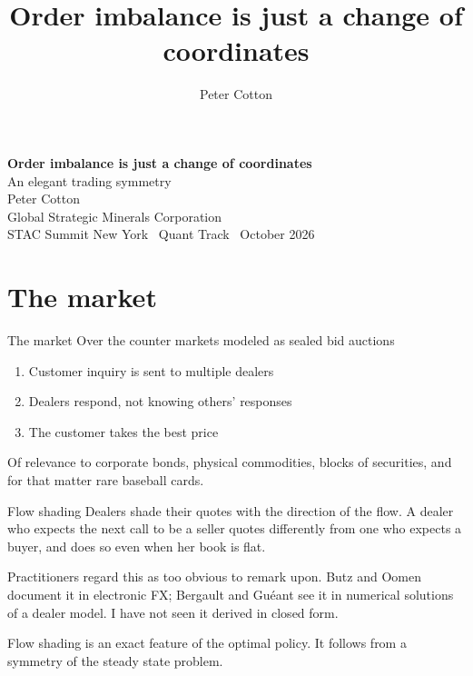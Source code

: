 \documentclass[10pt]{beamer}
\title[Order imbalance is just a change of coordinates]{Order imbalance is just a change of coordinates}
\author{Peter Cotton}
\newcommand{\blue}[1]{\textcolor{pcblue}{#1}}
\begin{document}
{
\begin{frame}[plain]
\vspace{1.6cm}
\begin{center}\color{white}
{\LARGE\bfseries Order imbalance is just a change of coordinates}\\[1.2ex]
{\large An elegant trading symmetry}\\[5ex]
{\normalsize Peter Cotton}\\[0.6ex]
{\small Global Strategic Minerals Corporation}\\[4ex]
{\small STAC Summit New York \textbar\ Quant Track \textbar\ October 2026}
\end{center}
\end{frame}}

\begin{frame}[plain]
\vspace{0.8cm}{\Large\bfseries Overview}\vspace{1em}
\tableofcontents
\end{frame}

\section{The market}

\begin{frame}{The market}
Over the counter markets modeled as sealed bid auctions
\begin{enumerate}
\item Customer inquiry is sent to multiple dealers
\item Dealers respond, not knowing others' responses
\item The customer takes the best price
\end{enumerate}
\vspace{1em}
Of relevance to corporate bonds, physical commodities, blocks of securities, and for that matter rare baseball cards.
\end{frame}

\begin{frame}{Flow shading}
Dealers shade their quotes with the direction of the flow. A dealer who expects the next call to be a seller quotes differently from one who expects a buyer, \blue{and does so even when her book is flat.}
\vspace{1em}

Practitioners regard this as too obvious to remark upon. Butz and Oomen document it in electronic FX; Bergault and Gu\'eant see it in numerical solutions of a dealer model. I have not seen it derived in closed form.
\vspace{1em}

Flow shading is an exact feature of the optimal policy. It follows from a symmetry of the steady state problem.
\end{frame}
\end{document}
